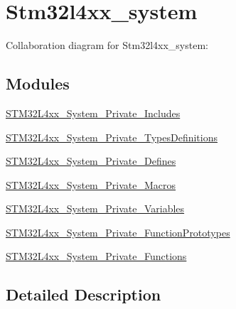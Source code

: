 \hypertarget{group__stm32l4xx__system}{}\section{Stm32l4xx\+\_\+system}
\label{group__stm32l4xx__system}
Collaboration diagram for Stm32l4xx\+\_\+system\+:
\subsection*{Modules}
\begin{DoxyCompactItemize}
\item 
\hyperlink{group__STM32L4xx__System__Private__Includes}{S\+T\+M32\+L4xx\+\_\+\+System\+\_\+\+Private\+\_\+\+Includes}
\item 
\hyperlink{group__STM32L4xx__System__Private__TypesDefinitions}{S\+T\+M32\+L4xx\+\_\+\+System\+\_\+\+Private\+\_\+\+Types\+Definitions}
\item 
\hyperlink{group__STM32L4xx__System__Private__Defines}{S\+T\+M32\+L4xx\+\_\+\+System\+\_\+\+Private\+\_\+\+Defines}
\item 
\hyperlink{group__STM32L4xx__System__Private__Macros}{S\+T\+M32\+L4xx\+\_\+\+System\+\_\+\+Private\+\_\+\+Macros}
\item 
\hyperlink{group__STM32L4xx__System__Private__Variables}{S\+T\+M32\+L4xx\+\_\+\+System\+\_\+\+Private\+\_\+\+Variables}
\item 
\hyperlink{group__STM32L4xx__System__Private__FunctionPrototypes}{S\+T\+M32\+L4xx\+\_\+\+System\+\_\+\+Private\+\_\+\+Function\+Prototypes}
\item 
\hyperlink{group__STM32L4xx__System__Private__Functions}{S\+T\+M32\+L4xx\+\_\+\+System\+\_\+\+Private\+\_\+\+Functions}
\end{DoxyCompactItemize}


\subsection{Detailed Description}
